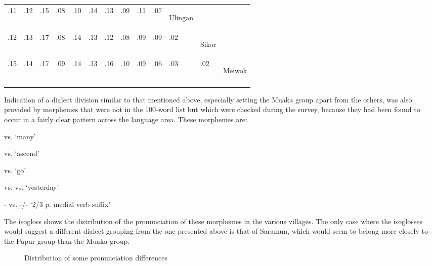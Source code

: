 \begin{table}
\begin{tabularx}{\textwidth}{lllllllllllll}
.11 & .12 & .15 & .08 & .10 & .14 & .13 & .09 & .11 & .07 &\begin{rotate}{0}{ Ulingan}\end{rotate} &  & \\

.12 & .13 & .17 & .08 & .14 & .13 & .12 & .08 & .09 & .09 & .02 & \begin{rotate}{0}{Sikor}\end{rotate} & \\

.15 & .14 & .17 & .09 & .14 & .13 & .16 & .10 & .09 & .06 & .03 & .02 & \begin{rotate}{0}{Meiwok}\end{rotate}	\\
\mybottomrule
\end{tabularx}
\end{table}
 

Indication of a dialect division similar to that mentioned above, especially setting the Muaka group apart from the others, was also provided by morphemes that were not in the 100-word list but which were checked during the survey, because they had been found to occur in a fairly clear pattern across the language area. These morphemes are:

    vs.        `many'

  vs.        `ascend'

    vs.        `go'

    vs.      vs.    `yesterday'

-   vs.  -/-      `2/3 p. medial verb suffix'

The isogloss  shows the distribution of the pronunciation of these morphemes in the various villages.  The only case where the isoglosses would suggest a different dialect grouping from the one presented above is that of Saramun, which would seem to belong more closely to the Papur group than the Muaka group.



\begin{figure}
\caption{Distribution of some pronunciation differences}
\label{map:6:prondistribution}
\end{figure}

